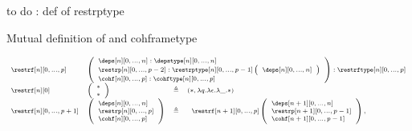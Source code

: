 \documentclass{msc}
\newcommand{\unitpoint}{\ensuremath{\ast}}
\newcommand{\defeq}{\ensuremath{\triangleq}}
\begin{document}
to do : def of restrptype

Mutual definition of \restrf and cohframetype

\begin{equation*}
  \fontsize{7.2}{9}\selectfont
  \begin{array}{llcl}
    \restrf[n][0,...,p]                        &
    \multicolumn{3}{l}{
      \left(\begin{array}{l}
                \deps[n][0,...,n]:\depstype[n][0,...,n] \\
                \restrp[n][0,...,p-2]:\restrptype[n][0,...,p-1]
                \left(\begin{array}{l}
                    \deps[n][0,...,n] \\
                  \end{array}\right)                \\
                \cohf[n][0,...,p]:\cohftype[n][0,...,p]
              \end{array}\right) : \restrftype[n][0,...,p]
    }                                                                                                                      \\
    \restrf[n][0]                              &
    \left(\begin{array}{l}
              \unitpoint \\
              \unitpoint \\
            \end{array}\right)                     & \defeq & (\unitpoint,\lambda q. \lambda\epsilon. \lambda \_.\unitpoint) \\
    \restrf[n][0,...,p+1]                      &
    \left(\begin{array}{l}
              \deps[n][0,...,n]   \\
              \restrp[n][0,...,p] \\
              \cohf[n][0,...,p]   \\
            \end{array}\right)                     & \defeq &
    \begin{array}{l}
      \restrf[n+1][0,...,p]
      \left(\begin{array}{l}
                \deps[n+1][0,...,n]     \\
                \restrp[n+1][0,...,p-1] \\
                \cohf[n+1][0,...,p-1]   \\
              \end{array}\right),                                             \\

\end{array}
\end{array}
\end{equation*}
\end{document}
